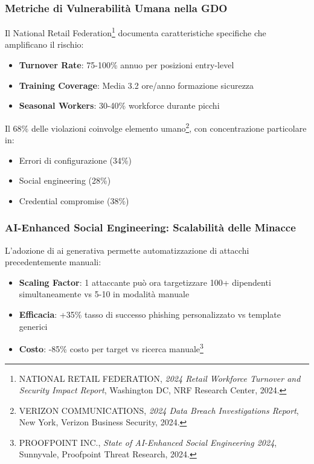 \subsubsection{Metriche di Vulnerabilità Umana nella GDO}

Il National Retail Federation\footnote{NATIONAL RETAIL FEDERATION, \textit{2024 Retail Workforce Turnover and Security Impact Report}, Washington DC, NRF Research Center, 2024.} documenta caratteristiche specifiche che amplificano il rischio:

\begin{itemize}
    \item \textbf{Turnover Rate}: 75-100\% annuo per posizioni entry-level
    \item \textbf{Training Coverage}: Media 3.2 ore/anno formazione sicurezza
    \item \textbf{Seasonal Workers}: 30-40\% workforce durante picchi
\end{itemize}

Il 68\% delle violazioni coinvolge elemento umano\footnote{VERIZON COMMUNICATIONS, \textit{2024 Data Breach Investigations Report}, New York, Verizon Business Security, 2024.}, con concentrazione particolare in:
\begin{itemize}
    \item Errori di configurazione (34\%)
    \item Social engineering (28\%)
    \item Credential compromise (38\%)
\end{itemize}

\subsubsection{AI-Enhanced Social Engineering: Scalabilità delle Minacce}

L'adozione di \gls{ai} generativa permette automatizzazione di attacchi precedentemente manuali:

\begin{itemize}
    \item \textbf{Scaling Factor}: 1 attaccante può ora targetizzare 100+ dipendenti simultaneamente vs 5-10 in modalità manuale
    \item \textbf{Efficacia}: +35\% tasso di successo phishing personalizzato vs template generici
    \item \textbf{Costo}: -85\% costo per target vs ricerca manuale\footnote{PROOFPOINT INC., \textit{State of AI-Enhanced Social Engineering 2024}, Sunnyvale, Proofpoint Threat Research, 2024.}
\end{itemize}

